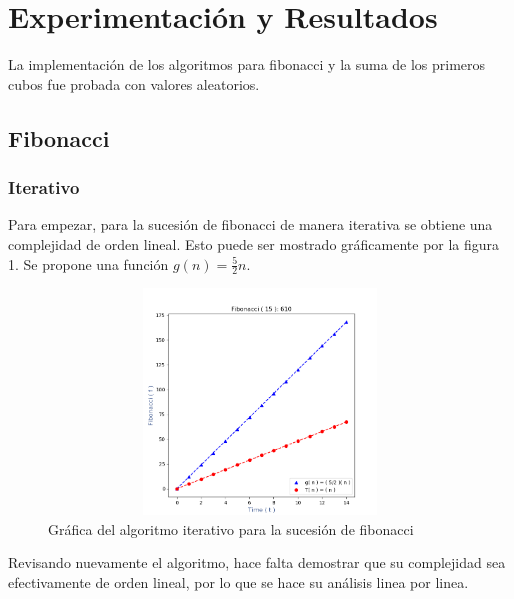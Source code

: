 \documentclass[12pt,twoside]{article}
\begin{document}
\section{Experimentaci\'on y Resultados}
La implementaci\'on de los algoritmos para fibonacci y la suma de los primeros cubos fue probada con valores aleatorios.
\subsection{Fibonacci}
\subsubsection{Iterativo}
Para empezar, para la sucesi\'on de fibonacci de manera iterativa se obtiene una complejidad de orden lineal. Esto puede ser mostrado gr\'aficamente por la figura 1. Se propone una funci\'on $g(n) = \frac{5}{2} n$.
\begin{figure}[ht]
    \centering
    \includegraphics[width = 13cm,height = 6cm]{fibonacci_iterativo_grafica.png}
    \caption{Gr\'afica del algoritmo iterativo para la sucesi\'on de fibonacci}
    \label{fig:fibonacci_iterativo_graph}
\end{figure}

Revisando nuevamente el algoritmo, hace falta demostrar que su complejidad sea efectivamente de orden lineal, por lo que se hace su an\'alisis linea por linea.
\end{document}
